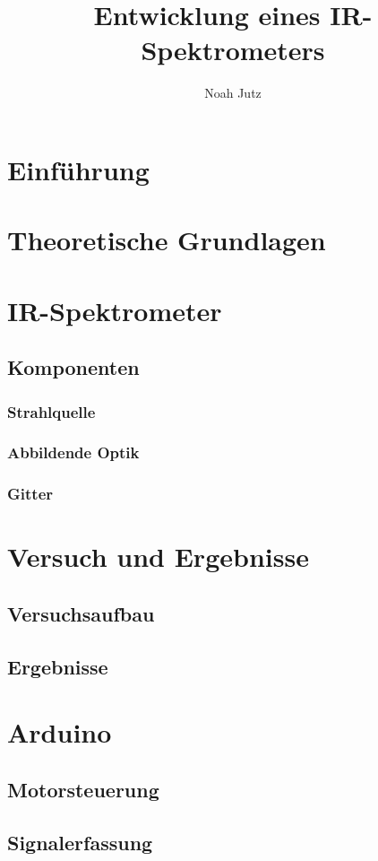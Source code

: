 \documentclass{article}
\title{Entwicklung eines IR-Spektrometers}
\author{Noah Jutz}
\date{}
\begin{document}
\maketitle

\tableofcontents

\section{Einführung}

\section{Theoretische Grundlagen}

\section{IR-Spektrometer}

\subsection{Komponenten}

\subsubsection{Strahlquelle}

\subsubsection{Abbildende Optik}

\subsubsection{Gitter}

\section{Versuch und Ergebnisse}

\subsection{Versuchsaufbau}

\subsection{Ergebnisse}

\section{Arduino}

\subsection{Motorsteuerung}

\subsection{Signalerfassung}
\end{document}
